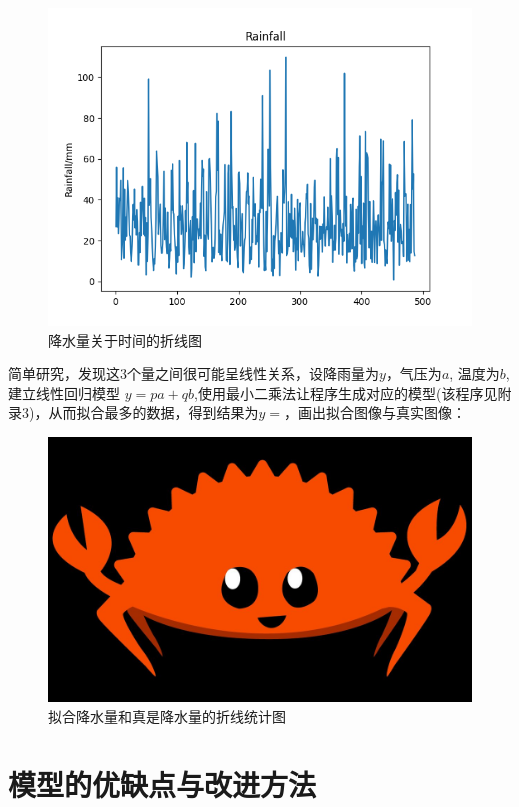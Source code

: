 \documentclass[UTF8, a4paper]{ctexart}
\begin{document}
\begin{figure}[h!]
	\centering
	\includegraphics[scale=0.5]{rr.png}
	\caption{降水量关于时间的折线图}
\end{figure}

简单研究，发现这3个量之间很可能呈线性关系，设降雨量为$y$，气压为$a$, 温度为$b$, 建立线性回归模型 $y=pa+qb$,使用最小二乘法让程序生成对应的模型(该程序见附录3)，从而拟合最多的数据，得到结果为$y=$，画出拟合图像与真实图像：

\begin{figure}[htbp]
	\centering
	\includegraphics[scale=0.1]{rust.jpg}
	\caption{拟合降水量和真是降水量的折线统计图}
\end{figure}


\section{模型的优缺点与改进方法}
\end{document}
